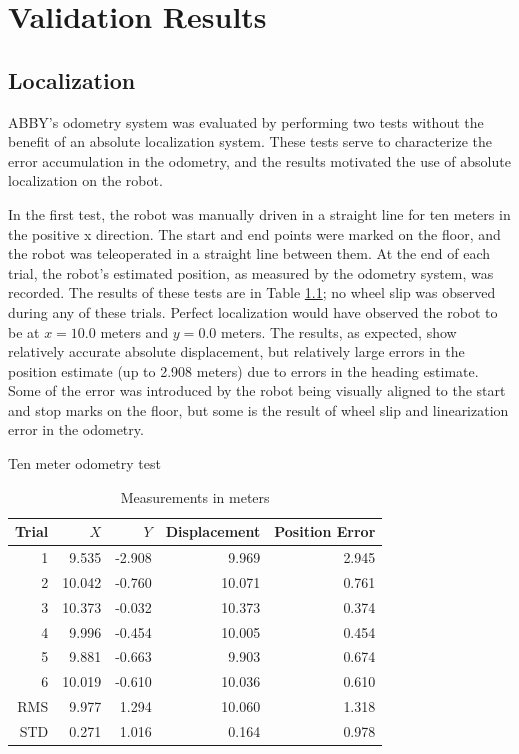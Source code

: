 \documentclass[]{cwru} %
\begin{document}
\chapter{Validation Results}

\section{Localization}

ABBY's odometry system was evaluated by performing two tests without the
benefit of an absolute localization system. These tests serve to
characterize the error accumulation in the odometry, and the results
motivated the use of absolute localization on the robot.

In the first test, the robot was manually driven in a straight line for
ten meters in the positive x direction. The start and end points were
marked on the floor, and the robot was teleoperated in a straight line
between them. At the end of each trial, the robot's estimated position,
as measured by the odometry system, was recorded. The results of these
tests are in Table \ref{tab:loc-straight-line}; no wheel slip was observed during any of these
trials. Perfect localization would have observed the robot to be at
$x=10.0$ meters and $y=0.0$ meters. The results, as expected, show
relatively accurate absolute displacement, but relatively large errors
in the position estimate (up to 2.908 meters) due to errors in the
heading estimate. Some of the error was introduced by the robot being
visually aligned to the start and stop marks on the floor, but some is
the result of wheel slip and linearization error in the odometry.

\begin{table}
\caption{Ten meter odometry test}
\label{tab:loc-straight-line}
\begin{tabular}[c]{rrrrr}
\toprule
\textbf{Trial} & \textbf{$X$} & \textbf{$Y$} & \textbf{Displacement} & \textbf{Position Error} \tabularnewline
\midrule
1   &  9.535 & -2.908 &  9.969 & 2.945\tabularnewline
2   & 10.042 & -0.760 & 10.071 & 0.761\tabularnewline
3   & 10.373 & -0.032 & 10.373 & 0.374\tabularnewline
4   &  9.996 & -0.454 & 10.005 & 0.454\tabularnewline
5   &  9.881 & -0.663 &  9.903 & 0.674\tabularnewline
6   & 10.019 & -0.610 & 10.036 & 0.610\tabularnewline
\midrule
RMS &  9.977 &  1.294 & 10.060 & 1.318\tabularnewline
\midrule
STD &  0.271 &  1.016 &  0.164 & 0.978\tabularnewline
\bottomrule
\end{tabular}
\caption*{Measurements in meters}
\end{table}
\end{document}
